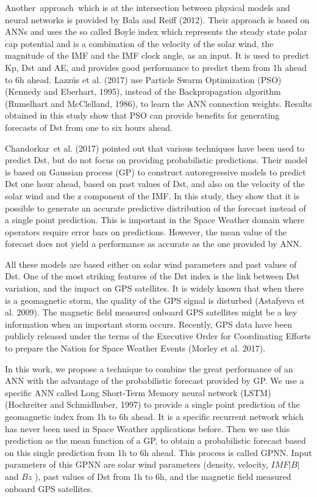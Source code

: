 Another\ approach\ which is at the intersection between physical models and neural networks is provided by 
Bala and Reiff (2012). Their approach is based on ANNs and uses the so called   Boyle index which represents 
the steady state polar cap potential and is a combination of the velocity of the solar wind, the magnitude of 
the IMF and the IMF clock angle, as an input. It is used to predict Kp, Dst and AE, and provides good performance 
to predict them from 1h ahead to 6h ahead. Lazzús et al. (2017) use Particle Swarm Optimization (PSO) 
(Kennedy and Eberhart, 1995), instead of the Backpropagation algorithm (Rumelhart and McClelland, 1986), 
to learn the ANN connection weights. Results obtained in this study show that PSO can provide benefits for 
generating forecasts of Dst from one to six hours ahead.

Chandorkar\ et al. (2017) pointed out that various techniques have been used to predict Dst, but do not 
focus on  providing probabilistic predictions. Their model is based on Gaussian process (GP) to construct 
autoregressive models to predict Dst one hour ahead, based on past values of Dst, and also on the velocity of 
the solar wind and the z component of the IMF. In this study, they show that it is possible to generate an 
accurate predictive distribution of the forecast instead of a single point prediction. This is important in the 
Space Weather domain where operators require error bars on predictions. However, the mean value of the forecast 
does not yield a performance as accurate as the one provided by ANN. 

All these models are based either on solar wind parameters and past values of Dst. One of the most striking features 
of the Dst index is the link between Dst variation, and the impact on GPS satellites. It is widely known that when 
there is a geomagnetic storm, the quality of the GPS signal is disturbed (Astafyeva et al. 2009). The magnetic field 
measured onboard GPS satellites might be a key information when an important storm occurs. Recently, GPS data have 
been publicly released under the terms of the Executive Order for Coordinating Efforts to prepare the Nation for 
Space Weather Events (Morley et al. 2017). 

In this work, we propose a technique to combine the great performance of an ANN with the advantage of the 
probabilistic forecast provided by GP. We use a specific ANN called Long Short-Term Memory neural network (LSTM) 
(Hochreiter and Schmidhuber, 1997) to provide a single point prediction of the geomagnetic index from 1h to 6h ahead. 
It is a specific recurrent network which has never been used in Space Weather applications before. Then we use this 
prediction as the mean function of a GP, to obtain a probabilistic forecast based on this single prediction from 
1h to 6h ahead. This process is called GPNN. Input parameters of this GPNN are solar wind parameters 
(density, velocity,  \( IMF  \vert B \vert  \)  and \(  Bz \) ), past values of Dst from 1h to 6h, and the 
magnetic field measured onboard GPS satellites. 


